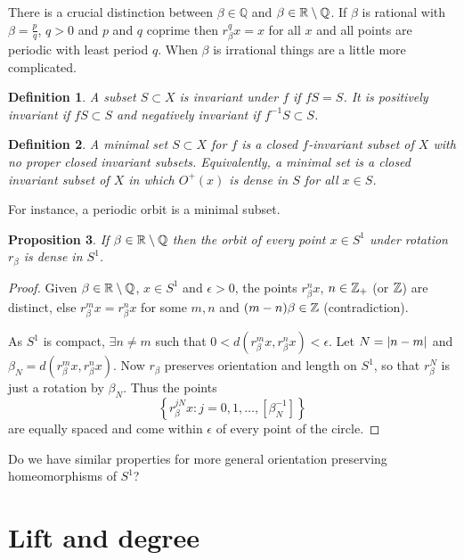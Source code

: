 \documentclass{notes}
\newcommand{\Q}{\mathbb{Q}}
\theoremstyle{plain}
\newtheorem{proposition}{Proposition}[chapter]
\newtheorem{definition}[proposition]{Definition}
\begin{document}
There is a crucial distinction between $\beta \in \Q$ and $\beta \in
\R \setminus \Q$.  If $\beta$ is rational with $\beta = \frac{p}{q}$,
$q>0$ and $p$ and $q$ coprime then $r_\beta^q x = x$ for all $x$ and
all points are periodic with least period $q$.  When $\beta$ is
irrational things are a little more complicated.

\begin{definition}
A subset $S \subset X$ is \emph{invariant} under $f$ if $f S = S$.
It is \emph{positively invariant} if $f S \subset S$ and
\emph{negatively invariant} if $f^{-1} S \subset S$.
\end{definition}

\begin{definition}
  A minimal set $S \subset X$ for $f$ is a closed $f$-invariant subset
  of $X$ with no proper closed invariant subsets.  Equivalently, a
  minimal set is a closed invariant subset of $X$ in which $O^+(x)$ is
  dense in $S$ for all $x \in S$.
\end{definition}

For instance, a periodic orbit is a minimal subset.

\begin{proposition}
If $\beta \in \R \setminus \Q$ then the orbit of every point $x \in S^1$
under rotation $r_\beta$ is dense in $S^1$.
\end{proposition}

\begin{proof}
Given $\beta \in \R \setminus \Q$, $x \in S^1$ and $\epsilon > 0$, the
points $r_\beta^n x$, $n \in \mathbb{Z}_+$ (or $\mathbb{Z}$) are distinct,
else $r^m_\beta x = r^n_\beta x$ for some $m,n$ and $(m-n) \beta \in \mathbb{Z}$
(contradiction). 

As $S^1$ is compact, $\exists n \neq m$ such that
$0 < d(r_\beta^m x, r_\beta^n x) < \epsilon$.  Let $N = \left|n - m\right|$
and $\beta_N = d(r_\beta^m x, r_\beta^n x)$.  Now $r_\beta$
preserves orientation and length on $S^1$, so that $r^N_\beta$
is just a rotation by $\beta_N$.  Thus the points
\[
\left\{r^{j N}_\beta x : j = 0, 1,\dots, \left[\beta_N^{-1}\right]\right\}
\]
are equally spaced and come within $\epsilon$ of every point of the circle.
\end{proof}

Do we have similar properties for more general orientation preserving
homeomorphisms of $S^1$?

\section{Lift and degree}
\end{document}
